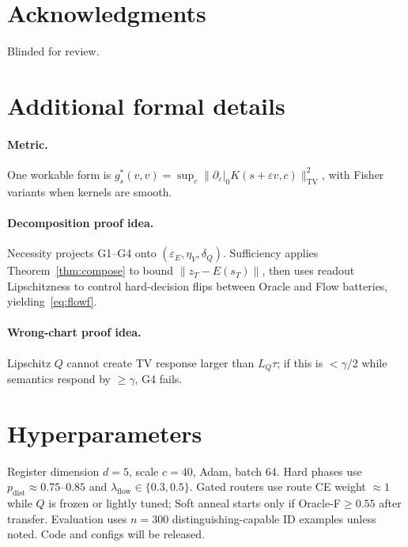 \documentclass[letterpaper,10pt,twocolumn]{article}
\theoremstyle{definition}
\newcommand{\TV}{\mathrm{TV}}
\begin{document}
\section*{Acknowledgments}
Blinded for review.

\appendix
\section{Additional formal details}
\label{app:formal}
\paragraph{Metric.}
One workable form is
$g^*_s(v,v)=\sup_c \|\partial_\varepsilon|_0 K(s+\varepsilon v,c)\|_{\TV}^2$,
with Fisher variants when kernels are smooth.
\paragraph{Decomposition proof idea.}
Necessity projects G1--G4 onto $(\varepsilon_E,\eta_V,\delta_Q)$.
Sufficiency applies Theorem~\ref{thm:compose} to bound $\|z_T-E(s_T)\|$, then uses readout Lipschitzness to control hard-decision flips between Oracle and Flow batteries, yielding~\eqref{eq:flowf}.
\paragraph{Wrong-chart proof idea.}
Lipschitz $Q$ cannot create TV response larger than $L_Q\tau$; if this is $<\gamma/2$ while semantics respond by $\ge\gamma$, G4 fails.

\section{Hyperparameters}
\label{app:hyper}
Register dimension $d{=}5$, scale $c{=}40$, Adam, batch $64$.
Hard phases use $p_{\mathrm{dist}}\!\approx\!0.75$--$0.85$ and $\lambda_{\mathrm{flow}}\!\in\!\{0.3,0.5\}$.
Gated routers use route CE weight $\approx\!1$ while $Q$ is frozen or lightly tuned; Soft anneal starts only if Oracle-F$\ge 0.55$ after transfer.
Evaluation uses $n{=}300$ distinguishing-capable ID examples unless noted.
Code and configs will be released.
\end{document}

